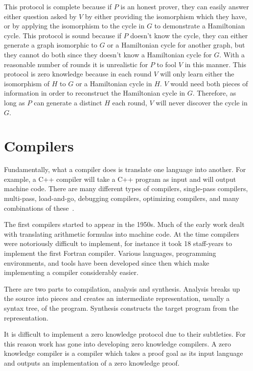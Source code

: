 \documentclass{sig-alternate}
\begin{document}
	This protocol is complete because if $P$ is an honest prover, they can easily
	answer either question asked by $V$ by either providing the isomorphism which
	they have, or by applying the isomorphism to the cycle in $G$ to demonstrate
	a Hamiltonian cycle. This protocol is sound because if $P$ doesn't know the
	cycle, they can either generate a graph isomorphic to $G$ or a Hamiltonian
	cycle for another graph, but they cannot do both since they doesn't know a
	Hamiltonian cycle for $G$. With a reasonable number of rounds it is
	unrealistic for $P$ to fool $V$ in this manner.	This protocol is zero knowledge 
	because in each round $V$ will only learn either the isomorphism of $H$ to $G$
	or a Hamiltonian cycle in $H$. $V$ would need both pieces of information in
	order to reconstruct the Hamiltonian cycle in $G$. Therefore, as long as $P$
	can generate a distinct $H$ each round, $V$ will never discover the cycle in $G$.
	

\section{Compilers}
	Fundamentally, what a compiler does is translate one language into
	another. For example, a C++ compiler will take a C++ program as input and
	will output machine code. There are many different types of
	compilers, single-pass compilers, multi-pass, load-and-go, debugging compilers,
	optimizing compilers, and many combinations of these~\cite{Compiler:1986}.
	
	The first compilers started to appear in the 1950s. Much of the early work
	dealt with translating arithmetic formulas into machine code. At the time
	compilers were notoriously difficult to implement, for instance it took
	18 staff-years to implement the first Fortran compiler. Various languages,
	programming	environments, and tools have been developed since then which
	make implementing a compiler considerably easier.
	
	There are two parts to compilation, analysis and synthesis. Analysis breaks
	up the source into pieces and creates an intermediate representation, usually
	a syntax tree, of the program. Synthesis constructs the target program from
    the representation.
    
    It is difficult to implement a zero knowledge protocol due to their
	subtleties. For this reason work has gone into
	developing zero knowledge compilers. A zero knowledge compiler is a
	compiler which takes a proof goal as its input language
	and outputs an implementation of a zero knowledge proof.
    
\end{document}
